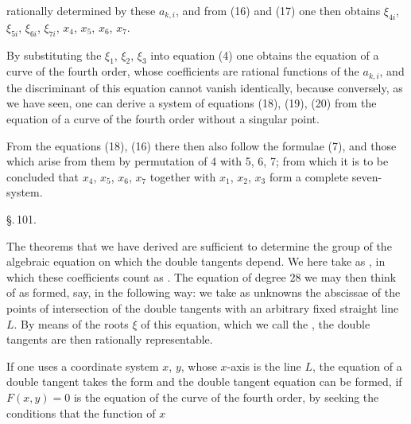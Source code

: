 rationally determined by these $a_{k,i}$, and from (16) and (17) one then obtains $\xi_{4i}$, $\xi_{5i}$, $\xi_{6i}$, $\xi_{7i}$, $x_4$, $x_5$, $x_6$, $x_7$.

By substituting the $\xi_1$, $\xi_2$, $\xi_3$ into equation (4) one obtains the equation of a curve of the fourth order, whose coefficients are rational functions of the $a_{k,i}$, and the discriminant of this equation cannot vanish identically, because conversely, as we have seen, one can derive a system of equations (18), (19), (20) from the equation of a curve of the fourth order without a singular point.

From the equations (18), (16) there then also follow the formulae (7), and those which arise from them by permutation of 4 with 5, 6, 7; from which it is to be concluded that $x_4$, $x_5$, $x_6$, $x_7$ together with $x_1$, $x_2$, $x_3$ form a complete seven-system.

\S.\,101.


The theorems that we have derived are sufficient to determine the  group of the algebraic equation on which the double tangents depend. We here take as , in which these coefficients count as . The equation of degree $28$ we may then think of as formed, say, in the following way: we take as unknowns the abscissae of the points of intersection of the double tangents with an arbitrary fixed straight line $L$. By means of the roots $\xi$ of this equation, which we call the , the double tangents are then rationally representable.

If one uses a  coordinate system $x$, $y$, whose $x$-axis is the line $L$, the equation of a double tangent takes the form
and the double tangent equation can be formed, if $F(x,y) = 0$ is the equation of the curve of the fourth order, by seeking the conditions that the function of $x$
